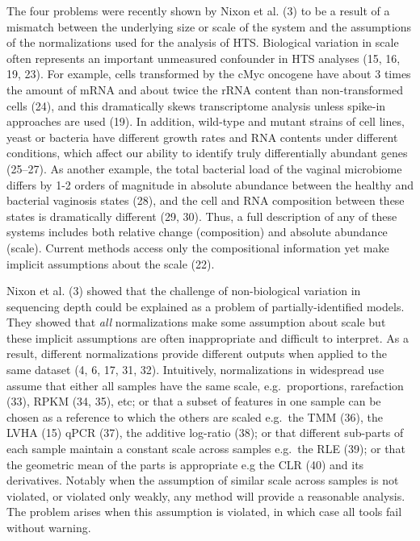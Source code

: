 \documentclass[
]{article}
\begin{document}
The four problems were recently shown by Nixon et al. (3) to be a result
of a mismatch between the underlying size or scale of the system and the
assumptions of the normalizations used for the analysis of HTS.
Biological variation in scale often represents an important unmeasured
confounder in HTS analyses (15, 16, 19, 23). For example, cells
transformed by the cMyc oncogene have about 3 times the amount of mRNA
and about twice the rRNA content than non-transformed cells (24), and
this dramatically skews transcriptome analysis unless spike-in
approaches are used (19). In addition, wild-type and mutant strains of
cell lines, yeast or bacteria have different growth rates and RNA
contents under different conditions, which affect our ability to
identify truly differentially abundant genes (25--27). As another
example, the total bacterial load of the vaginal microbiome differs by
1-2 orders of magnitude in absolute abundance between the healthy and
bacterial vaginosis states (28), and the cell and RNA composition
between these states is dramatically different (29, 30). Thus, a full
description of any of these systems includes both relative change
(composition) and absolute abundance (scale). Current methods access
only the compositional information yet make implicit assumptions about
the scale (22).

Nixon et al. (3) showed that the challenge of non-biological variation
in sequencing depth could be explained as a problem of
partially-identified models. They showed that \emph{all} normalizations
make some assumption about scale but these implicit assumptions are
often inappropriate and difficult to interpret. As a result, different
normalizations provide different outputs when applied to the same
dataset (4, 6, 17, 31, 32). Intuitively, normalizations in widespread
use assume that either all samples have the same scale,
e.g.~proportions, rarefaction (33), RPKM (34, 35), etc; or that a subset
of features in one sample can be chosen as a reference to which the
others are scaled e.g.~the TMM (36), the LVHA (15) qPCR (37), the
additive log-ratio (38); or that different sub-parts of each sample
maintain a constant scale across samples e.g.~the RLE (39); or that the
geometric mean of the parts is appropriate e.g the CLR (40) and its
derivatives. Notably when the assumption of similar scale across samples
is not violated, or violated only weakly, any method will provide a
reasonable analysis. The problem arises when this assumption is
violated, in which case all tools fail without warning.
\end{document}
